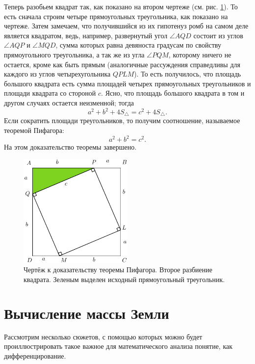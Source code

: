 \documentclass[12pt]{article}
\begin{document}
\par
Теперь разобьем квадрат так, как показано на втором чертеже (см. рис. \ref{fig:32}). То есть сначала строим четыре прямоугольных треугольника, как показано на чертеже. Затем замечаем, что получившийся из их гипотенуз ромб на самом деле является квадратом, ведь, например, развернутый угол $\angle AQD$ состоит из углов $\angle AQP$ и $\angle MQD$, сумма которых равна девяноста градусам по свойству прямоугольного треугольника, а так же из угла $\angle PQM$, которому ничего не остается, кроме как быть прямым (аналогичные рассуждения справедливы для каждого из углов четырехугольника $QPLM$). То есть получилось, что площадь большого квадрата есть сумма площадей четырех прямоугольных треугольников и площади квадрата со стороной $c$. Ясно, что площадь большого квадрата в том и другом случаях остается неизменной; тогда
\begin{equation}
 a^2 + b^2 + 4S_\triangle=c^2+4S_\triangle.
\end{equation}
Если сократить площади треугольников, то получим соотношение, называемое теоремой Пифагора:
\begin{equation}
 a^2 + b^2 =c^2.
\end{equation}
На этом доказательство теоремы завершено.
\begin{figure}[ht]
	\centering
	\includegraphics[width=0.5\textwidth]{first22.pdf}
	\caption{Чертёж к доказательству теоремы Пифагора. Второе разбиение квадрата. Зеленым выделен исходный прямоугольный треугольник.}
	\label{fig:32}
\end{figure}
\section{Вычисление массы Земли}
Рассмотрим несколько сюжетов, с помощью которых можно будет проиллюстрировать такое важное для математического анализа понятие, как дифференцирование. 
\end{document}
